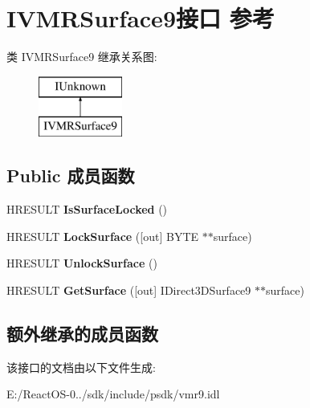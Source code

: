 \hypertarget{interface_i_v_m_r_surface9}{}\section{I\+V\+M\+R\+Surface9接口 参考}
\label{interface_i_v_m_r_surface9}
类 I\+V\+M\+R\+Surface9 继承关系图\+:\begin{figure}[H]
\begin{center}
\leavevmode
\includegraphics[height=2.000000cm]{interface_i_v_m_r_surface9}
\end{center}
\end{figure}
\subsection*{Public 成员函数}
\begin{DoxyCompactItemize}
\item 
\mbox{\label{interface_i_v_m_r_surface9_a8a0eaed823d61efa6fe106edd97035df}} 
H\+R\+E\+S\+U\+LT {\bfseries Is\+Surface\+Locked} ()
\item 
\mbox{\label{interface_i_v_m_r_surface9_a058d697c945a5242e6df0e4349e8baae}} 
H\+R\+E\+S\+U\+LT {\bfseries Lock\+Surface} (\mbox{[}out\mbox{]} B\+Y\+TE $\ast$$\ast$surface)
\item 
\mbox{\label{interface_i_v_m_r_surface9_ac85f7e4f91c913416daa7cdc1daeabfe}} 
H\+R\+E\+S\+U\+LT {\bfseries Unlock\+Surface} ()
\item 
\mbox{\label{interface_i_v_m_r_surface9_a950b484cca8255ee85ddc88512411a22}} 
H\+R\+E\+S\+U\+LT {\bfseries Get\+Surface} (\mbox{[}out\mbox{]} I\+Direct3\+D\+Surface9 $\ast$$\ast$surface)
\end{DoxyCompactItemize}
\subsection*{额外继承的成员函数}


该接口的文档由以下文件生成\+:\begin{DoxyCompactItemize}
\item 
E\+:/\+React\+O\+S-\/0../sdk/include/psdk/vmr9.\+idl\end{DoxyCompactItemize}
